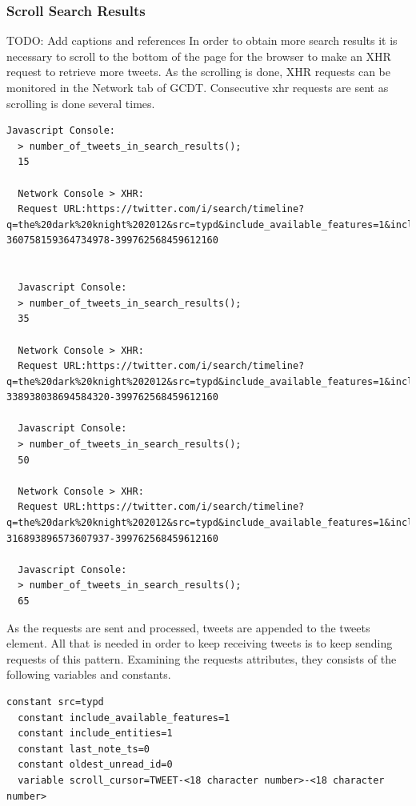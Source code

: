 \subsubsection{Scroll Search Results}
TODO: Add captions and references
In order to obtain more search results it is necessary to scroll to the bottom of the page for the browser to make an XHR request to retrieve more tweets. As the scrolling is done, XHR requests can be monitored in the Network tab of GCDT. Consecutive xhr requests are sent as scrolling is done several times.

  \begin{lstlisting}[caption={TODO: Caption},label={},captionpos=b]
  Javascript Console:
  > number_of_tweets_in_search_results();
  15

  Network Console > XHR:
  Request URL:https://twitter.com/i/search/timeline?q=the%20dark%20knight%202012&src=typd&include_available_features=1&include_entities=1&last_note_ts=0&scroll_cursor=TWEET-360758159364734978-399762568459612160


  Javascript Console:
  > number_of_tweets_in_search_results();
  35

  Network Console > XHR:
  Request URL:https://twitter.com/i/search/timeline?q=the%20dark%20knight%202012&src=typd&include_available_features=1&include_entities=1&last_note_ts=0&oldest_unread_id=0&scroll_cursor=TWEET-338938038694584320-399762568459612160

  Javascript Console:
  > number_of_tweets_in_search_results();
  50

  Network Console > XHR:
  Request URL:https://twitter.com/i/search/timeline?q=the%20dark%20knight%202012&src=typd&include_available_features=1&include_entities=1&last_note_ts=0&oldest_unread_id=0&scroll_cursor=TWEET-316893896573607937-399762568459612160

  Javascript Console:
  > number_of_tweets_in_search_results();
  65
  \end{lstlisting}

As the requests are sent and processed, tweets are appended to the tweets element. All that is needed in order to keep receiving tweets is to keep sending requests of this pattern.
Examining the requests attributes, they consists of the following variables and constants.

  \begin{lstlisting}[caption={TODO: Caption},label={},captionpos=b]
  constant src=typd
  constant include_available_features=1
  constant include_entities=1
  constant last_note_ts=0
  constant oldest_unread_id=0
  variable scroll_cursor=TWEET-<18 character number>-<18 character number>
  \end{lstlisting}


